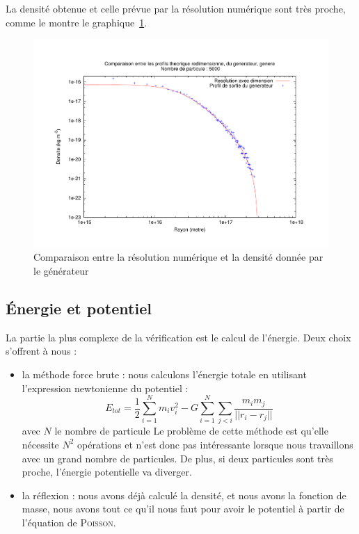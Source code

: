 			La densité obtenue et celle prévue par la résolution numérique sont très proche,
			comme le montre le graphique~\ref{Comp_gene-theo}.
			\begin{figure}[h!]
				\centering \includegraphics[scale=0.5]{graphe/Comp_dens_gene-theo_5000.pdf}
				\caption{Comparaison entre la résolution numérique et la densité donnée par le générateur\label{Comp_gene-theo}}
			\end{figure}

		\subsection{Énergie et potentiel}

			La partie la plus complexe de la vérification est le calcul de l'énergie. Deux
			choix s'offrent à nous :
			\begin{itemize}
				\item la méthode force brute : nous calculons l'énergie totale en utilisant
					l'expression newtonienne du potentiel :
					$$
						E_{tot} = \frac{1}{2}\sum_{i = 1}^{N} m_i v_i^2 - G \sum_{i = 1}^{N} \sum_{j < i} \dfrac{m_i m_j}{|| r_i - r_j ||}
					$$
					avec $N$ le nombre de particule Le problème de cette méthode est qu'elle nécessite $N^2$
				opérations et n'est donc pas intéressante lorsque nous travaillons avec un grand
				nombre de particules. De plus, si deux particules sont très proche,
				l'énergie potentielle va diverger.
				\item la réflexion : nous avons déjà calculé la densité, et nous avons
					la fonction de masse, nous avons tout ce qu'il nous faut pour
					avoir le potentiel à partir de l'équation de \textsc{Poisson}.
			\end{itemize}

